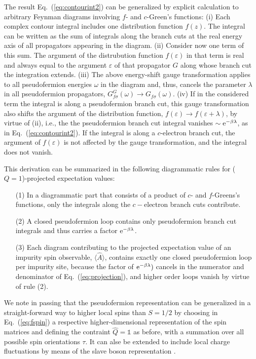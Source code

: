 \documentclass[12pt,twoside]{article}
\newcommand{\Eq}[1]{Eq.~(\ref{#1})}
\begin{document}
The result \Eq{eq:contourint2} can be generalized by explicit 
calculation to arbitrary Feynman diagrams involving $f$- and $c$-Green's 
functions: 
(i) Each complex contour integral includes one distribution function 
$f(z)$. The integral can be written as the sum of integrals along the 
branch cuts at the real energy axis of all propagators appearing in the diagram.
(ii) Consider now one term of this sum. The argument of the distrubution 
function $f(\varepsilon)$ in that term is real and always equal to the 
argument $\varepsilon$ of that propagator $G$ along whose branch cut the 
integration extends. 
(iii) The above energy-shift gauge transformation applies to all 
pseudofermion energies $\omega$ in the diagram and, thus, cancels the 
parameter $\lambda$ in all pseudofermion propagators, 
$G_{f\sigma}^G(\omega)\to G_{f\sigma}(\omega)$. 
(iv) If in the considered term the integral is along 
a pseudofermion branch cut, this gauge transformation also shifts the 
argument of the distribution function, 
$f(\varepsilon)\to f(\varepsilon+\lambda)$, by virtue of (ii), i.e., the 
the pseudofermion branch cut integral vanishes 
$\sim {\rm  e}^{-\beta\lambda}$, as in \Eq{eq:contourint2}. 
If the integral is along a $c$-electron branch cut, the argument of 
$f(\varepsilon)$ is not affected by the gauge transformation, and the 
integral does not vanish. 

This derivation can be summarized in the following diagrammatic rules
for ($Q=1$)-projected expectation values:
\begin{itemize}
\item[(1)]
In a diagrammatic part that consists of a product of 
$c$- and $f$-Greens's functions, 
only the integrals along the $c-$electron branch cuts contribute.\\[-1.0cm]
\item[(2)]
A closed pseudofermion loop contains only pseudofermion branch cut integrals
and thus carries a factor ${\rm e}^{-\beta\lambda}$.\\[-1.0cm]
\item[(3)]
Each diagram contributing to the 
projected expectation value of an impurity spin observable, 
$\langle \hat A \rangle$, contains exactly one closed pseudofermion
loop per impurity site, because the factor of ${\rm e}^{-\beta\lambda})$ 
cancels in the numerator and denominator of \Eq{eq:projection}, 
and higher order loops vanish by virtue of rule (2). 
\end{itemize}

We note in passing that the pseudofermion representation can be 
generalized in a straight-forward way to higher local spins than $S=1/2$ by 
choosing in \Eq{eq:fspin} a respective higher-dimensional representation 
of the spin matrices and defining the contraint $\hat{Q}=\mathds{1}$ as 
before, with a summation over all possible spin orientations $\tau$. 
It can alse be extended to include local charge fluctuations by means 
of the slave boson representation 
\cite{Barnes76,Coleman84,Kroha98,Kroha97}. 
\end{document}
